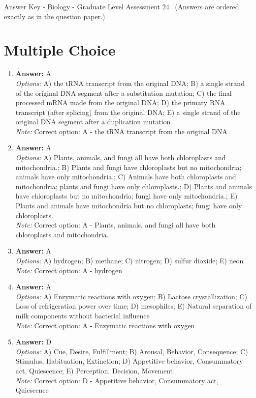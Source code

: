 \documentclass[12pt]{article}
\begin{document}
\begin{center}
Answer Key - Biology - Graduate Level Assessment 24 \
\small (Answers are ordered exactly as in the question paper.)
\end{center}

\section*{Multiple Choice}
\begin{enumerate}[label=\arabic*.]
\item \textbf{Answer:} A
\\ \textit{Options:} A) the tRNA transcript from the original DNA; B) a single strand of the original DNA segment after a substitution mutation; C) the final processed mRNA made from the original DNA; D) the primary RNA transcript (after splicing) from the original DNA; E) a single strand of the original DNA segment after a duplication mutation
\\ \textit{Note:} Correct option: A - the tRNA transcript from the original DNA
\item \textbf{Answer:} A
\\ \textit{Options:} A) Plants, animals, and fungi all have both chloroplasts and mitochondria.; B) Plants and fungi have chloroplasts but no mitochondria; animals have only mitochondria.; C) Animals have both chloroplasts and mitochondria; plants and fungi have only chloroplasts.; D) Plants and animals have chloroplasts but no mitochondria; fungi have only mitochondria.; E) Plants and animals have mitochondria but no chloroplasts; fungi have only chloroplasts.
\\ \textit{Note:} Correct option: A - Plants, animals, and fungi all have both chloroplasts and mitochondria.
\item \textbf{Answer:} A
\\ \textit{Options:} A) hydrogen; B) methane; C) nitrogen; D) sulfur dioxide; E) neon
\\ \textit{Note:} Correct option: A - hydrogen
\item \textbf{Answer:} A
\\ \textit{Options:} A) Enzymatic reactions with oxygen; B) Lactose crystallization; C) Loss of refrigeration power over time; D) mesophiles; E) Natural separation of milk components without bacterial influence
\\ \textit{Note:} Correct option: A - Enzymatic reactions with oxygen
\item \textbf{Answer:} D
\\ \textit{Options:} A) Cue, Desire, Fulfillment; B) Arousal, Behavior, Consequence; C) Stimulus, Habituation, Extinction; D) Appetitive behavior, Consummatory act, Quiescence; E) Perception, Decision, Movement
\\ \textit{Note:} Correct option: D - Appetitive behavior, Consummatory act, Quiescence
\end{enumerate}
\end{document}
